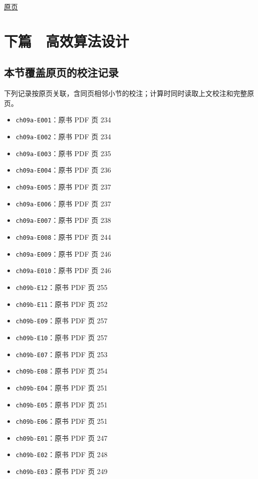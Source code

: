 \documentclass[
  10pt,
  fontset=fandol]{ctexart}
\providecommand{\tightlist}{%
  \setlength{\itemsep}{0pt}\setlength{\parskip}{0pt}}
\begin{document}
\href{../../source-images/pdf-261.jpeg}{原页}

\section{下篇　高效算法设计}\label{ux4e0bux7bc7-ux9ad8ux6548ux7b97ux6cd5ux8bbeux8ba1}

\subsection{本节覆盖原页的校注记录}\label{ux672cux8282ux8986ux76d6ux539fux9875ux7684ux6821ux6ce8ux8bb0ux5f55}

下列记录按原页关联，含同页相邻小节的校注；计算时同时读取上文校注和完整原页。

\begin{itemize}
\tightlist
\item
  \texttt{ch09a-E001}：原书 PDF 页 234
\item
  \texttt{ch09a-E002}：原书 PDF 页 234
\item
  \texttt{ch09a-E003}：原书 PDF 页 235
\item
  \texttt{ch09a-E004}：原书 PDF 页 236
\item
  \texttt{ch09a-E005}：原书 PDF 页 237
\item
  \texttt{ch09a-E006}：原书 PDF 页 237
\item
  \texttt{ch09a-E007}：原书 PDF 页 238
\item
  \texttt{ch09a-E008}：原书 PDF 页 244
\item
  \texttt{ch09a-E009}：原书 PDF 页 246
\item
  \texttt{ch09a-E010}：原书 PDF 页 246
\item
  \texttt{ch09b-E12}：原书 PDF 页 255
\item
  \texttt{ch09b-E11}：原书 PDF 页 252
\item
  \texttt{ch09b-E09}：原书 PDF 页 257
\item
  \texttt{ch09b-E10}：原书 PDF 页 257
\item
  \texttt{ch09b-E07}：原书 PDF 页 253
\item
  \texttt{ch09b-E08}：原书 PDF 页 254
\item
  \texttt{ch09b-E04}：原书 PDF 页 251
\item
  \texttt{ch09b-E05}：原书 PDF 页 251
\item
  \texttt{ch09b-E06}：原书 PDF 页 251
\item
  \texttt{ch09b-E01}：原书 PDF 页 247
\item
  \texttt{ch09b-E02}：原书 PDF 页 248
\item
  \texttt{ch09b-E03}：原书 PDF 页 249
\end{itemize}
\end{document}
